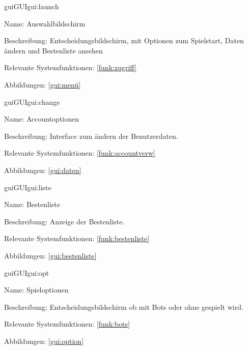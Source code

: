 \begin{description}[leftmargin=5em, style=sameline]	
	\begin{lhp}{gui}{GUI}{gui:launch}
		\item[Name:] Auswahlbildschirm
		\item[Beschreibung:] Entscheidungsbildschirm, mit Optionen zum Spielstart, Daten ändern und Bestenliste ansehen
		\item[Relevante Systemfunktionen:] \ref{funk:zugriff}
		\item[Abbildungen:] \ref{gui:menü}
	\end{lhp}
\end{description}

\begin{description}[leftmargin=5em, style=sameline]	
	\begin{lhp}{gui}{GUI}{gui:change}
		\item[Name:] Accountoptionen
		\item[Beschreibung:] Interface zum ändern der Benutzerdaten.
		\item[Relevante Systemfunktionen:] \ref{funk:accountverw}
		\item[Abbildungen:] \ref{gui:daten}
	\end{lhp}
\end{description}

\begin{description}[leftmargin=5em, style=sameline]	
	\begin{lhp}{gui}{GUI}{gui:liste}
		\item[Name:] Bestenliste
		\item[Beschreibung:] Anzeige der Bestenliste.
		\item[Relevante Systemfunktionen:] \ref{funk:bestenliste}
		\item[Abbildungen:] \ref{gui:bestenliste}
	\end{lhp}
\end{description}

\begin{description}[leftmargin=5em, style=sameline]	
	\begin{lhp}{gui}{GUI}{gui:opt}
		\item[Name:] Spieloptionen
		\item[Beschreibung:] Entscheidungsbildschirm ob mit Bots oder ohne gespielt wird.
		\item[Relevante Systemfunktionen:] \ref{funk:bots}
		\item[Abbildungen:] \ref{gui:option}
	\end{lhp}
\end{description}

